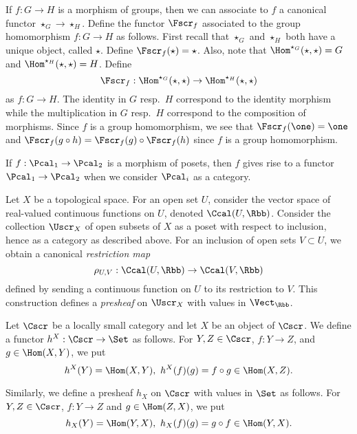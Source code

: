 \begin{example}
  If $f : G \to H$ is a morphism of groups, then we can associate to $f$ a canonical functor $\star_{G} \to \star_{H}$.
  Define the functor $\Fscr_f$ associated to the group homomorphism $f : G \to H$ as follows.
  First recall that $\star_G$ and $\star_H$ both have a unique object, called $\star$.
  Define $\Fscr_f(\star) = \star$.
  Also, note that $\Hom^{\star_G}(\star,\star) = G$ and $\Hom^{\star_H}(\star,\star) = H$.
  Define
  \[ \Fscr_f : \Hom^{\star_G}(\star,\star) \to \Hom^{\star_H}(\star,\star) \] 
  as $f : G \to H$.
  The identity in $G$ resp.~$H$ correspond to the identity morphism while the multiplication in $G$ resp.~$H$ correspond to the composition of morphisms.
  Since $f$ is a group homomorphism, we see that $\Fscr_f(\one) = \one$ and $\Fscr_f(g \circ h) = \Fscr_f(g) \circ \Fscr_f(h)$ since $f$ is a group homomorphism.
\end{example}

\begin{example}
  If $f : \Pcal_{1} \to \Pcal_{2}$ is a morphism of posets, then $f$ gives rise to a functor $\Pcal_{1} \to \Pcal_{2}$ when we consider $\Pcal_{i}$ as a category.
\end{example}

\begin{example}
  Let $X$ be a topological space.
  For an open set $U$, consider the vector space of real-valued continuous functions on $U$, denoted $\Ccal(U,\Rbb)$.
  Consider the collection $\Uscr_{X}$ of open subsets of $X$ as a poset with respect to inclusion, hence as a category as described above.
  For an inclusion of open sets $V \subset U$, we obtain a canonical \emph{restriction map}
  \[ \rho_{U,V}: \Ccal(U,\Rbb) \to \Ccal(V,\Rbb) \]
  defined by sending a continuous function on $U$ to its restriction to $V$.
  This construction defines a \emph{presheaf} on $\Uscr_{X}$ with values in $\Vect_{\Rbb}$.
\end{example}

\begin{example}
  Let $\Cscr$ be a locally small category and let $X$ be an object of $\Cscr$.
  We define a functor $h^{X} : \Cscr \to \Set$ as follows.
  For $Y, Z \in \Cscr$, $f : Y \to Z$, and $g \in \Hom(X,Y)$, we put
  \[ h^{X}(Y) = \Hom(X,Y), \ h^{X}(f)(g) = f \circ g \in \Hom(X,Z). \]

  Similarly, we define a presheaf $h_{X}$ on $\Cscr$ with values in $\Set$ as follows.
  For $Y,Z \in \Cscr$, $f : Y \to Z$ and $g \in \Hom(Z,X)$, we put
  \[ h_{X}(Y) = \Hom(Y,X), \ h_{X}(f)(g) = g \circ f \in \Hom(Y,X). \]
\end{example}

